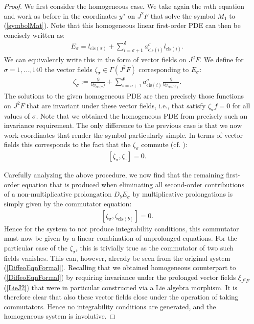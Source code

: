 \begin{proof}
We first consider the homogeneous case. We take again the $m$th equation and work as before in the coordinates $y^a$ on $J^2F$ that solve the symbol $M_1$ to (\ref{symbolMat}). Note that this homogeneous linear first-order PDE can then be concisely written as:
\begin{align}
    E_{\sigma} = l_{\mathrm{cls}(\sigma)} + \sum_{i = \sigma+1}^{\mathcal{k}} a^{\sigma}_{\mathrm{cls}(i)} l_{\mathrm{cls}(i) } .
\end{align}
We can equivalently write this in the form of vector fields on $J^2F$. We define for $\sigma = 1,...,140$ the vector fields $\zeta_{\sigma} \in \Gamma(J^2F) $ corresponding to $E_{\sigma}$:
\begin{align}
    \zeta_{\sigma} := \frac{\partial}{\partial y_{\mathrm{cls}(\sigma})} + \sum_{i = \sigma+1}^{\mathcal{k}} a^{\sigma}_{\mathrm{cls}(i)} \frac{\partial}{\partial y_{\mathrm{cls}(i)}}.
\end{align}
The solutions to the given homogeneous PDE are then precisely those functions on $J^2F$ that are invariant under these vector fields, i.e., that satisfy $\zeta_{\sigma} f = 0$ for all values of $\sigma$.
Note that we obtained the homogeneous PDE from precisely such an invariance requirement. The only difference to the previous case is that we now work coordinates that render the symbol particularly simple. 
In terms of vector fields this corresponds to the fact that the $\zeta_{\sigma}$ commute (cf. \cite{seiler1994analysis}):
\begin{align}
    \left [ \zeta_{\sigma}, \zeta_{\tau}\right ] =0.
\end{align}

Carefully analyzing the above procedure, we now find that the remaining first-order equation that is produced when eliminating all second-order contributions of a non-multiplicative prolongation $D_bE_{\sigma}$ by multiplicative prolongations is simply given by the commutator equation:
\begin{align}
    \left [\zeta_{\sigma}, \zeta_{\mathrm{cls}(b)} \right] = 0.
\end{align}
Hence for the system to not produce integrability conditions, this commutator must now be given by a linear combination of unprolonged equations. For the particular case of the $\zeta_{\sigma}$, this is trivially true as the commutator of two such fields vanishes. This can, however, already be seen from the original system (\ref{DiffeoEqnFormal}).
Recalling that we obtained homogeneous counterpart to (\ref{DiffeoEqnFormal}) by requiring invariance under the prolonged vector fields $\xi_{J^2F}$ (\ref{LieJ2}) that were in particular constructed via a Lie algebra morphism. It is therefore clear that also these vector fields close under the operation of taking commutators. Hence no integrability conditions are generated, and the homogeneous system is involutive.


\end{proof}
